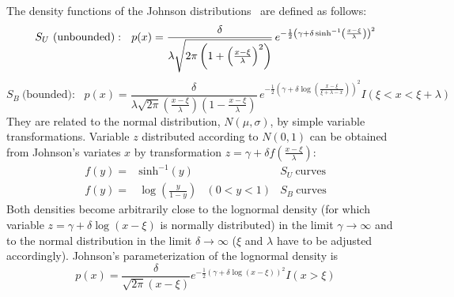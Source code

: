 \documentclass[12pt,titlepage]{article}
\begin{document}
The density functions of the Johnson
distributions~\cite{ref:johnson, ref:johnsonbook, ref:hahnshap}
are defined as follows:
\begin{equation}
S_{U}\ \mbox{(unbounded)}:\ \ p(x) = \frac{\delta}{\lambda \sqrt{2 \pi \left(1 + 
\left(\frac{x - \xi}{\lambda}\right)^{2}\right)}} \,e^{-\frac{1}{2}
\left(\gamma + \delta\,\mbox{\scriptsize sinh}^{-1}\left(\frac{x-\xi}
{\lambda}\right)\right)^{2}}
\label{eq:johnsu}
\end{equation}
\begin{equation}
S_{B}\ \mbox{(bounded)}:\ \ \ p(x) = \frac{\delta}{\lambda \sqrt{2 \pi}
\left(\frac{x - \xi}{\lambda}\right)\left(1 - \frac{x - \xi}{\lambda}\right)}
\,e^{-\frac{1}{2}\left( \gamma + \delta \log \left( \frac{x-\xi}
{\xi + \lambda - x}\right) \right)^{2}} I(\xi < x < \xi + \lambda)
\label{eq:johnsb}
\end{equation}
They are related to the normal distribution, $N(\mu, \sigma)$,
by simple variable
transformations. Variable $z$ distributed according to $N(0, 1)$
can be 
obtained from Johnson's variates $x$ by transformation
$z = \gamma + \delta f\left(\frac{x-\xi}{\lambda}\right)$:
\begin{displaymath}
\begin{array}{rlll}
f(y) = & \mbox{sinh}^{-1}(y) & & S_{U}\ \mbox{curves}\\
f(y) = & \log \left(\frac{y}{1-y}\right) & (0 < y < 1) & S_{B}\ \mbox{curves}
\end{array}
\end{displaymath}
Both densities become arbitrarily close to the lognormal density (for which
variable $z = \gamma + \delta \log (x - \xi)$ is normally distributed)
in the limit $\gamma \rightarrow \infty$
and to the normal distribution in the limit $\delta \rightarrow \infty$ 
($\xi$ and $\lambda$ have to be adjusted accordingly). Johnson's
parameterization of the lognormal density is
\begin{equation}
p(x) = \frac{\delta}{\sqrt{2 \pi} (x - \xi)} e^{-\frac{1}{2} (\gamma + \delta \log (x - \xi))^2} I(x > \xi)
\end{equation}
\end{document}
